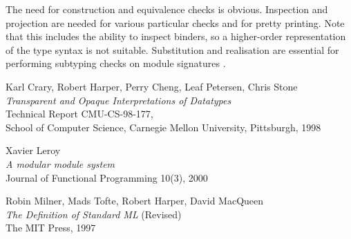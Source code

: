 \documentclass[twoside]{article}
\begin{document}
The need for construction and equivalence checks is obvious. Inspection and projection are needed for various particular checks and for pretty printing. Note that this includes the ability to inspect binders, so a higher-order representation of the type syntax is not suitable. Substitution and realisation are essential for performing subtyping checks on module signatures \cite{modules}.


\begin{thebibliography}{CHCPS98}

Karl Crary, Robert Harper, Perry Cheng, Leaf Petersen, Chris Stone \\
{\it Transparent and Opaque Interpretations of Datatypes} \\
Technical Report CMU-CS-98-177, \\
School of Computer Science, Carnegie Mellon University, Pittsburgh, 1998

Xavier Leroy \\
{\it A modular module system} \\
Journal of Functional Programming 10(3), 2000

Robin Milner, Mads Tofte, Robert Harper, David MacQueen \\
{\it The Definition of Standard ML} (Revised) \\
The MIT Press, 1997

\end{thebibliography}

\end{document}
